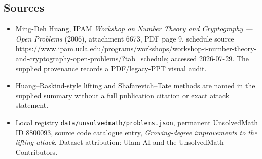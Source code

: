 \documentclass[11pt]{article}
\begin{document}
\subsection{Sources}
\begin{itemize}
\item Ming-Deh Huang, IPAM \emph{Workshop on Number Theory and Cryptography --- Open Problems} (2006), attachment 6673, PDF page 9, schedule source \url{https://www.ipam.ucla.edu/programs/workshops/workshop-i-number-theory-and-cryptography-open-problems/?tab=schedule}; accessed 2026-07-29. The supplied provenance records a PDF/legacy-PPT visual audit.
\item Huang--Raskind-style lifting and Shafarevich--Tate methods are named in the supplied summary without a full publication citation or exact attack statement.
\item Local registry \texttt{data/unsolvedmath/problems.json}, permanent UnsolvedMath ID $8800093$, source code catalogue entry, \emph{Growing-degree improvements to the lifting attack}. Dataset attribution: Ulam AI and the UnsolvedMath Contributors.
\end{itemize}
\end{document}
